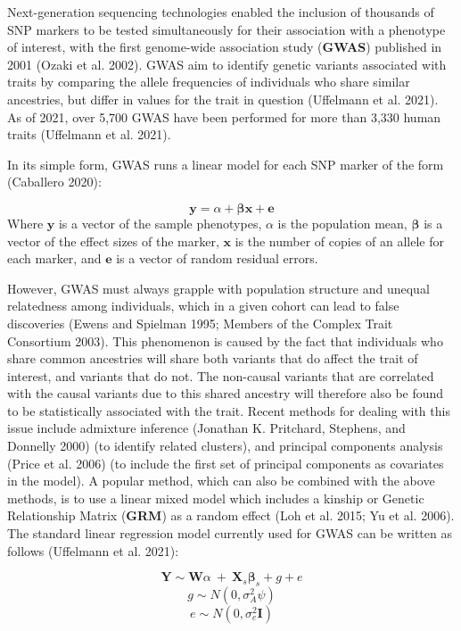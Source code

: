 \documentclass[
]{book}
\begin{document}
Next-generation sequencing technologies enabled the inclusion of thousands of SNP markers to be tested simultaneously for their association with a phenotype of interest, with the first genome-wide association study (\textbf{GWAS}) published in 2001 (Ozaki et al. 2002). GWAS aim to identify genetic variants associated with traits by comparing the allele frequencies of individuals who share similar ancestries, but differ in values for the trait in question (Uffelmann et al. 2021). As of 2021, over 5,700 GWAS have been performed for more than 3,330 human traits (Uffelmann et al. 2021).

In its simple form, GWAS runs a linear model for each SNP marker of the form (Caballero 2020):

\[
\textbf{y} = \alpha + \boldsymbol{\beta} \textbf{x} + \textbf{e}
\]
Where \(\textbf{y}\) is a vector of the sample phenotypes, \(\alpha\) is the population mean, \(\boldsymbol{\beta}\) is a vector of the effect sizes of the marker, \(\textbf{x}\) is the number of copies of an allele for each marker, and \(\textbf{e}\) is a vector of random residual errors.

However, GWAS must always grapple with population structure and unequal relatedness among individuals, which in a given cohort can lead to false discoveries (Ewens and Spielman 1995; Members of the Complex Trait Consortium 2003). This phenomenon is caused by the fact that individuals who share common ancestries will share both variants that do affect the trait of interest, and variants that do not. The non-causal variants that are correlated with the causal variants due to this shared ancestry will therefore also be found to be statistically associated with the trait. Recent methods for dealing with this issue include admixture inference (Jonathan K. Pritchard, Stephens, and Donnelly 2000) (to identify related clusters), and principal components analysis (Price et al. 2006) (to include the first set of principal components as covariates in the model). A popular method, which can also be combined with the above methods, is to use a linear mixed model which includes a kinship or Genetic Relationship Matrix (\textbf{GRM}) as a random effect (Loh et al. 2015; Yu et al. 2006). The standard linear regression model currently used for GWAS can be written as follows (Uffelmann et al. 2021):

\begin{equation}
\textbf{Y} \sim \textbf{W} \alpha ~+~\textbf{X}_s\boldsymbol{\beta}_s + g + e
\end{equation}
\begin{equation}
g \sim N(0,\sigma^2_A\psi)
\end{equation}
\begin{equation}
e \sim N(0,\sigma^2_e \textbf{I})
\end{equation}
\end{document}
